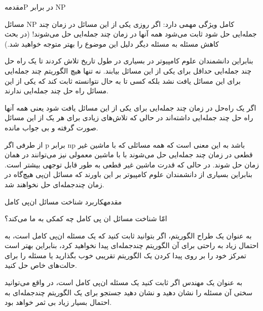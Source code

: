 \begin{itemframe-s}{مقدمه}{P در برابر NP}
\decLineSpace
\item[-]
مسائل NP کامل ویژگی مهمی دارد: اگر روزی یکی از این مسائل در زمان چند جمله‌ایی حل شود ثابت می‌شود همه آنها در زمان چند جمله‌ایی حل می‌شوند! (در بحث کاهش مسئله به مسئله‌ دیگر دلیل این موضوع را بهتر متوجه خواهید شد.)
 \item[-]
بنابراین دانشمندان علوم کامپیوتر در بسیاری در طول تاریخ تلاش کردند تا یک راه حل چند جمله‌ایی حداقل برای یکی از این مسائل بیابند. نه تنها هیچ الگوریتم چند جمله‌ایی برای این مسائل یافت نشد بلکه کسی تا به حال نتوانسته ثابت کند که یکی از این مسائل راه حل چند جمله‌ایی ندارند.
 \item[-]
اگر یک راه‌حل در زمان چند جمله‌ایی برای یکی از این مسائل یافت شود یعنی همه آنها راه حل چند جمله‌ایی داشته‌اند در حالی که تلاش‌های زیادی برای هر یک از این مسائل صورت گرفته و بی جواب مانده.
 \item[-]
از طرفی اگر p برابر np باشد به این معنی است که همه مسائلی که با ماشین غیر قطعی در زمان چند جمله‌ایی حل می‌شوند با با ماشین معمولی نیز می‌توانند در همان زمان حل شوند. در حالی که قدرت ماشین غیر قطعی به طور قابل توجهی بیشتر است.
بنابراین بسیاری از دانشمندان علوم کامپیوتر بر این باورند که مسائل ان‌پی هیچ‌گاه در زمان چند‌جمله‌ای حل نخواهند شد.
\end{itemframe-s}

\begin{itemframe-s}{مقدمه}{کاربرد شناخت مسائل  ان‌پی کامل}
\item[-]
امّا شناخت مسائل ان پی کامل چه کمکی به ما می‌کند؟
\item[-]
به عنوان یک طراح الگوریتم، اگر بتوانید ثابت کنید که یک مسئله ان‌پی کامل است، به احتمال زیاد به راحتی برای آن الگوریتم چندجمله‌ای پیدا نخواهید کرد، بنابراین بهتر است تمرکز خود را بر روی پیدا کردن یک الگوریتم تقریبی خوب بگذارید یا مسئله را برای حالت‌های خاص حل کنید.
\item[-]
به عنوان یک مهندس اگر ثابت کنید یک مسئله ان‌پی کامل است، در واقع می‌توانید سختی آن مسئله را نشان دهید و نشان دهید جستجو برای یک الگوریتم چندجمله‌ای به احتمال بسیار زیاد بی ثمر خواهد بود.
\end{itemframe-s}


